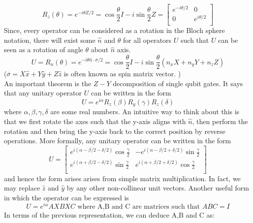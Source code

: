 \begin{equation}
R_z(\theta) = e^{-i\theta Z/2} = \cos{\frac{\theta}{2}}I - i\sin{\frac{\theta}{2}}Z = \left[ {\begin{array}{cc}
   e^{-i\theta/2} & 0\\
   0 & e^{i\theta/2}  \\
  \end{array} } \right]
\end{equation}
Since, every operator can be considered as a rotation in the Bloch sphere notation, there will exist some $\hat{n}$ and $\theta$ for all operators $U$ such that $U$ can be seen as a rotation of angle $\theta$ about $\hat{n}$ axis. 
\begin{equation}
U=R_n(\theta) = e^{-i\theta \hat{n}\cdot \overline{\sigma}/2} = \cos{\frac{\theta}{2}}I - i\sin{\frac{\theta}{2}}(n_x X + n_y Y + n_z  Z) 
\end{equation}
($\overline{\sigma} = X\hat{x} + Y\hat{y} + Z\hat{z}$ is often known as spin matrix vector. )\\
An important theorem is the $Z-Y$ decomposition of single qubit gates. It says that any unitary operator $U$ can be written in the form
\begin{equation}
U= e^{i\alpha} R_z(\beta)R_y(\gamma)R_z(\delta)
\end{equation}
where $\alpha, \beta, \gamma,  \delta$ are some real numbers. An intuitive way to think about this is that we first rotate the axes such that the y-axis aligns with $\hat{n}$, then perform the rotation and then bring the y-axis back to the correct position by reverse operations. More formally, any unitary operator can be written in the form
\begin{equation}
U = \left[ {\begin{array}{cc}
   e^{i(\alpha -\beta/2-\delta/2)} \cos{\frac{\gamma}{2}} & -e^{i(\alpha -\beta/2+\delta/2)} \sin{\frac{\gamma}{2}}\\
   e^{i(\alpha +\beta/2-\delta/2)} \sin{\frac{\gamma}{2}} & e^{i(\alpha +\beta/2+\delta/2)} \cos{\frac{\gamma}{2}}  \\
  \end{array} } \right]
\end{equation}and hence the form arises arises from simple matrix multiplication. In fact, we may replace $\hat{z}$ and $\hat{y}$ by any other non-collinear unit vectors. Another useful form in which the operator can be expressed is 
\begin{equation}
U = e^{i\alpha}AXBXC \text{ where A,B and C are matrices such that } ABC = I
\end{equation}In terms of the previous representation, we can deduce A,B and C as:
